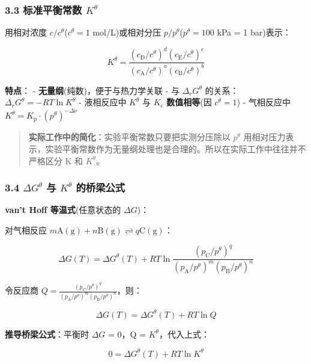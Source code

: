 \documentclass[a4paper,11pt]{ctexart}
\newcommand{\箭}{\ensuremath{\rightarrow}}
\newcommand{\左箭}{\ensuremath{\leftarrow}}
\newcommand{\上箭}{\ensuremath{\uparrow}}
\newcommand{\下箭}{\ensuremath{\downarrow}}
\newcommand{\衡}{\ensuremath{\rightleftharpoons}}
\newcommand{\双箭}{\ensuremath{\leftrightarrow}}
\newcommand{\约等于}{\ensuremath{\approx}}
\newcommand{\小于等于}{\ensuremath{\leq}}
\newcommand{\大于等于}{\ensuremath{\geq}}
\newcommand{\不等于}{\ensuremath{\neq}}
\newcommand{\西格马}{\ensuremath{\sigma}}
\newcommand{\派}{\ensuremath{\pi}}
\begin{document}
\subsubsection{\texorpdfstring{3.3 标准平衡常数 \(K^\theta\)}{3.3 标准平衡常数 K\^{}\textbackslash theta}}\label{ux6807ux51c6ux5e73ux8861ux5e38ux6570-ktheta}

用相对浓度 \(c/c^\theta\)(\(c^\theta = 1\) mol/L)或相对分压 \(p/p^\theta\)(\(p^\theta = 100\) kPa = 1 bar)表示：

\[
K^\theta = \frac{(c_\mathrm{D}/c^\theta)^d(c_\mathrm{E}/c^\theta)^e}{(c_\mathrm{A}/c^\theta)^a(c_\mathrm{B}/c^\theta)^b}
\]

\textbf{特点}：
- \textbf{无量纲}(纯数)，便于与热力学关联
- 与 \(\Delta_r G^\theta\) 的关系：\(\Delta_r G^\theta = -RT\ln K^\theta\)
- 液相反应中 \(K^\theta\) 与 \(K_{\mathrm c}\) \textbf{数值相等}(因 \(c^\theta = 1\))
- 气相反应中 \(K^\theta = K_{\mathrm p} \cdot (p^\theta)^{-\Delta\nu}\)

\begin{quote}
\textbf{实际工作中的简化}：实验平衡常数只要把实测分压除以 \(p^\theta\) 用相对压力表示，实验平衡常数作为无量纲处理也是合理的。所以在实际工作中往往并不严格区分 K 和 \(K^\theta\)。
\end{quote}

\subsubsection{\texorpdfstring{3.4 \(\Delta G^\theta\) 与 \(K^\theta\) 的桥梁公式}{3.4 \textbackslash Delta G\^{}\textbackslash theta 与 K\^{}\textbackslash theta 的桥梁公式}}\label{delta-gtheta-ux4e0e-ktheta-ux7684ux6865ux6881ux516cux5f0f}

\textbf{van't Hoff 等温式}(任意状态的 \(\Delta G\))：

对气相反应 \(m\mathrm{A(g)} + n\mathrm{B(g)} \rightleftharpoons q\mathrm{C(g)}\)：

\[
\Delta G(T) = \Delta G^\theta(T) + RT\ln\frac{(p_\mathrm{C}/p^\theta)^q}{(p_\mathrm{A}/p^\theta)^m(p_\mathrm{B}/p^\theta)^n}
\]

令反应商 \(Q = \frac{(p_\mathrm{C}/p^\theta)^q}{(p_\mathrm{A}/p^\theta)^m(p_\mathrm{B}/p^\theta)^n}\)，则：

\[
\boxed{\Delta G(T) = \Delta G^\theta(T) + RT\ln Q}
\]

\textbf{推导桥梁公式}：平衡时 \(\Delta G\) = 0，Q = \(K^\theta\)，代入上式：

\[
0 = \Delta G^\theta(T) + RT\ln K^\theta
\]
\end{document}
